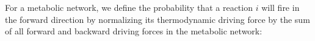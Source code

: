 For a metabolic network, we define the probability that a reaction $i$ will fire in  the forward direction by normalizing its thermodynamic driving force by the sum of all forward and backward driving forces in the metabolic network: